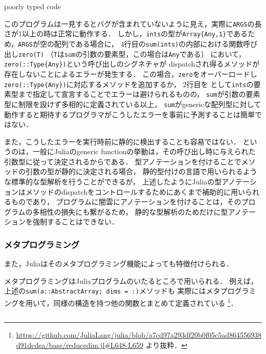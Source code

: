 \begin{listing}[ht]
  \inputminted[frame=lines]{julia}{src/parse_sum.jl}
  \caption{poorly typed code}
  \label{lst:target1}
\end{listing}

このプログラムは一見するとバグが含まれていないように見え，実際に\verb|ARGS|の長さが1以上の時は正常に動作する．
しかし，\verb|ints|の型が\verb|Array{Any,1}|であるため，\verb|ARGS|が空の配列である場合に，
4行目の\verb|sum(ints)|の内部における関数呼び出し\verb|zero(T)|
（\verb|T|は\verb|sum|の引数の要素型，この場合は\verb|Any|である）
において， \verb|zero(::Type{Any})|という呼び出しのシグネチャが
dispatchされ得るメソッドが存在しないことによるエラーが発生する．
この場合，\verb|zero|をオーバーロードし\verb|zero(::Type{Any})|に対応するメソッドを追加するか，
2行目を  として\verb|ints|の要素型まで指定して宣言することでエラーは避けられるものの，
\verb|sum|が引数の要素型に制限を設けず多相的に定義されている以上，
\verb|sum|がgenericな配列型に対して動作すると期待するプログラマがこうしたエラーを事前に予測することは簡単ではない．

また，こうしたエラーを実行時前に静的に検出することも容易ではない．
というのは，一般にJuliaのgeneric functionの挙動は，その呼び出し時に与えられた引数型に従って決定されるからである．
型アノテーションを付けることでメソッドの引数の型が静的に決定される場合，
静的型付けの言語で用いられるような標準的な型解析を行うことができるが，
上述したようにJuliaの型アノテーションはメソッドのdispatchをコントロールするためにあくまで補助的に用いられるものであり，
プログラムに闇雲にアノテーションを付けることは，そのプログラムの多相性の損失にも繋がるため，
静的な型解析のためだけに型アノテーションを強制することはできない．

\subsubsection{メタプログラミング}

また，Juliaはそのメタプログラミング機能によっても特徴付けられる．

メタプログラミングはJuliaプログラムのいたるところで用いられる．
例えば，上述の\verb|sum(a::AbstractArray; dims = :)|メソッドも
実際にはメタプログラミングを用いて，同様の構造を持つ他の関数とまとめて定義されている
\footnote{
  \url{https://github.com/JuliaLang/julia/blob/a7cd97a293df20b0f05c5ad864556938d91dcdea/base/reducedim.jl\#L648-L659}
  より抜粋．
}．

\inputminted[frame=lines, firstline=3, lastline=12, breaklines]{julia}{src/sums_def.jl}

